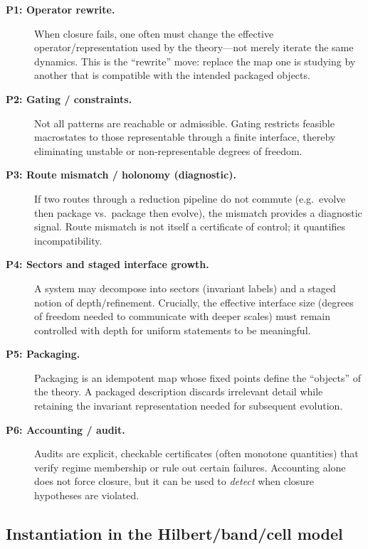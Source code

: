 \documentclass[11pt]{article}
\begin{document}
\begin{description}
\item[\textbf{P1: Operator rewrite.}]
When closure fails, one often must change the effective operator/\hspace{0pt}representation used by the theory---not merely iterate the same dynamics.
This is the ``rewrite'' move: replace the map one is studying by another that is compatible with the intended packaged objects.

\item[\textbf{P2: Gating / constraints.}]
Not all patterns are reachable or admissible.
Gating restricts feasible macrostates to those representable through a finite interface, thereby eliminating unstable or non-representable degrees of freedom.

\item[\textbf{P3: Route mismatch / holonomy (diagnostic).}]
If two routes through a reduction pipeline do not commute (e.g.\ evolve then package vs.\ package then evolve), the mismatch provides a diagnostic signal.
Route mismatch is not itself a certificate of control; it quantifies incompatibility.

\item[\textbf{P4: Sectors and staged interface growth.}]
A system may decompose into sectors (invariant labels) and a staged notion of depth/refinement.
Crucially, the effective interface size (degrees of freedom needed to communicate with deeper scales) must remain controlled with depth for uniform statements to be meaningful.

\item[\textbf{P5: Packaging.}]
Packaging is an idempotent map whose fixed points define the ``objects'' of the theory.
A packaged description discards irrelevant detail while retaining the invariant representation needed for subsequent evolution.

\item[\textbf{P6: Accounting / audit.}]
Audits are explicit, checkable certificates (often monotone quantities) that verify regime membership or rule out certain failures.
Accounting alone does not force closure, but it can be used to \emph{detect} when closure hypotheses are violated.
\end{description}

\subsection{Instantiation in the Hilbert/band/cell model}
\end{document}
